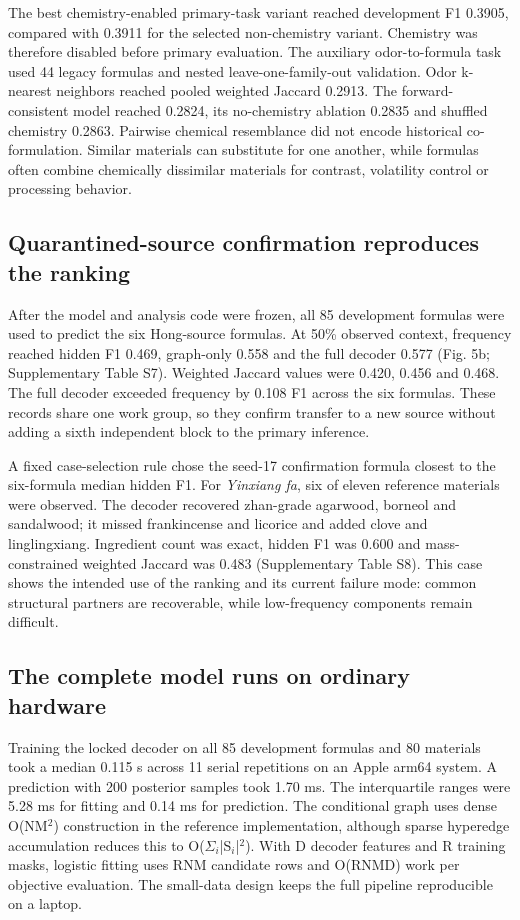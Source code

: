 \documentclass[12pt]{article}
\begin{document}
The best chemistry-enabled primary-task variant reached development F1 0.3905, compared with 0.3911 for the selected non-chemistry variant. Chemistry was therefore disabled before primary evaluation. The auxiliary odor-to-formula task used 44 legacy formulas and nested leave-one-family-out validation. Odor k-nearest neighbors reached pooled weighted Jaccard 0.2913. The forward-consistent model reached 0.2824, its no-chemistry ablation 0.2835 and shuffled chemistry 0.2863. Pairwise chemical resemblance did not encode historical co-formulation. Similar materials can substitute for one another, while formulas often combine chemically dissimilar materials for contrast, volatility control or processing behavior.

\subsection*{Quarantined-source confirmation reproduces the ranking}

After the model and analysis code were frozen, all 85 development formulas were used to predict the six Hong-source formulas. At 50\% observed context, frequency reached hidden F1 0.469, graph-only 0.558 and the full decoder 0.577 (Fig. 5b; Supplementary Table S7). Weighted Jaccard values were 0.420, 0.456 and 0.468. The full decoder exceeded frequency by 0.108 F1 across the six formulas. These records share one work group, so they confirm transfer to a new source without adding a sixth independent block to the primary inference.

A fixed case-selection rule chose the seed-17 confirmation formula closest to the six-formula median hidden F1. For \emph{Yinxiang fa}, six of eleven reference materials were observed. The decoder recovered zhan-grade agarwood, borneol and sandalwood; it missed frankincense and licorice and added clove and linglingxiang. Ingredient count was exact, hidden F1 was 0.600 and mass-constrained weighted Jaccard was 0.483 (Supplementary Table S8). This case shows the intended use of the ranking and its current failure mode: common structural partners are recoverable, while low-frequency components remain difficult.

\subsection*{The complete model runs on ordinary hardware}

Training the locked decoder on all 85 development formulas and 80 materials took a median 0.115 s across 11 serial repetitions on an Apple arm64 system. A prediction with 200 posterior samples took 1.70 ms. The interquartile ranges were 5.28 ms for fitting and 0.14 ms for prediction. The conditional graph uses dense O(NM\ensuremath{{}^{2}}) construction in the reference implementation, although sparse hyperedge accumulation reduces this to O(\ensuremath{\Sigma}\ensuremath{_{i}}|S\ensuremath{_{i}}|\ensuremath{{}^{2}}). With D decoder features and R training masks, logistic fitting uses RNM candidate rows and O(RNMD) work per objective evaluation. The small-data design keeps the full pipeline reproducible on a laptop.
\end{document}
